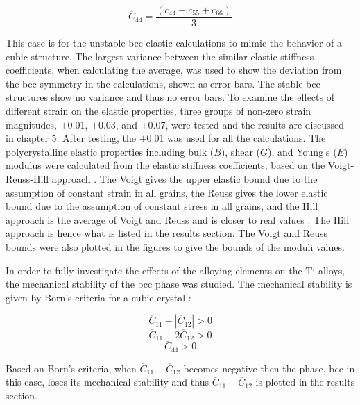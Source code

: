 \begin{equation}
\label{eq: averagec44}
\overline{C}_{44} = \frac{(c_{44} + c_{55} + c_{66})}{3}
\end{equation}

\noindent This case is for the unstable bcc elastic calculations to mimic the behavior of a cubic structure. The largest variance between the similar elastic stiffness coefficients, when calculating the average, was used to show the deviation from the bcc symmetry in the calculations, shown as error bars. The stable bcc structures show no variance and thus no error bars. To examine the effects of different strain on the elastic properties, three groups of non-zero strain magnitudes, $\pm$0.01, $\pm$0.03, and $\pm$0.07, were tested and the results are discussed in chapter 5. After testing, the $\pm$0.01 was used for all the calculations. The polycrystalline elastic properties including bulk ($B$), shear ($G$), and Young's ($E$) modulus were calculated from the elastic stiffness coefficients, based on the Voigt-Reuss-Hill approach \cite{Simmons1971b}. The Voigt gives the upper elastic bound due to the assumption of constant strain in all grains, the Reuss gives the lower elastic bound due to the assumption of constant stress in all grains, and the Hill approach is the average of Voigt and Reuss and is closer to real values \cite{Zuo1993,Chung1967}. The Hill approach is hence what is listed in the results section. The Voigt and Reuss bounds were also plotted in the figures to give the bounds of the moduli values.

In order to fully investigate the effects of the alloying elements on the Ti-alloys, the mechanical stability of the bcc phase was studied. The mechanical stability is given by Born's criteria for a cubic crystal  \cite{Born1998,Nye1985}:


\begin{equation}
\label{eq: born1}
\overline{C}_{11} -|\overline{C}_{12}| > 0
\end{equation}
\begin{equation}
\label{eq: born2}
\overline{C}_{11} + 2\overline{C}_{12} > 0
\end{equation}
\begin{equation}
\label{eq: born3}
\overline{C}_{44} > 0
\end{equation}

\noindent Based on Born's criteria, when $\overline{C}_{11} - \overline{C}_{12}$ becomes negative then the phase, bcc in this case, loses its mechanical stability and thus $\overline{C}_{11} - \overline{C}_{12}$ is plotted in the results section.


